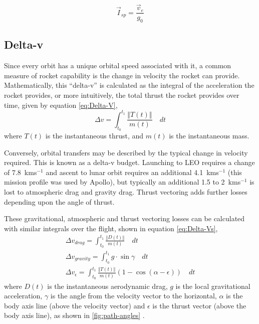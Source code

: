 \begin{equation}
\vec{I}_{sp}=\frac{\vec{v}_e}{g_0}
\end{equation}

\subsection{Delta-v} \label{sub:Delta-v}

Since every orbit has a unique orbital speed associated with it, a common measure of rocket capability is the change in velocity the rocket can provide. Mathematically, this \enquote{delta-v} is calculated as the integral of the acceleration the rocket provides, or more intuitively, the total thrust the rocket provides over time, given by equation \eqref{eq:Delta-V},
\begin{equation}\label{eq:Delta-V}
\Delta v=\int_{t_{0}}^{t_{1}}\frac{\left\Vert T\left(t\right)\right\Vert }{m\left(t\right)}\quad dt
\end{equation}
where $T\left(t\right)$ is the instantaneous thrust, and $m\left(t\right)$ is the instantaneous mass.

Conversely, orbital transfers may be described by the typical change in velocity required. This is known as a delta-v budget. Launching to LEO requires a change of 7.8~kms$^{-1}$ and ascent to lunar orbit requires an additional 4.1~kms$^{-1}$ (this mission profile was used by Apollo), but typically an additional 1.5 to 2~kms$^{-1}$ is lost to atmospheric drag and gravity drag. Thrust vectoring adds further losses depending upon the angle of thrust. 

These gravitational, atmospheric and thrust vectoring losses can be calculated with similar integrals over the flight, shown in equation \eqref{eq:Delta-Vs},
\begin{subequations} \label{eq:Delta-Vs}
\begin{gather}
\Delta v_{drag}=\int_{t_0}^{t_1}\frac{\left\Vert D\left(t\right)\right\Vert }{m\left(t\right)}\quad dt\label{eq:drag-penalty} \\
\Delta v_{gravity}=\int_{t_0}^{t_1}g\cdot\sin\gamma\quad dt\label{eq:gravity-penalty} \\
\Delta v_\epsilon=\int_{t_0}^{t_1}\frac{\left\Vert T\left(t\right)\right\Vert }{m\left(t\right)}(1-\cos(\alpha-\epsilon))\quad dt\label{eq:thrust-vectoring-penalty}
\end{gather}
\end{subequations}
where $D(t)$ is the instantaneous aerodynamic drag, $g$ is the local gravitational acceleration, $\gamma$ is the angle from the velocity vector to the horizontal, $\alpha$ is the body axis line (above the velocity vector) and $\epsilon$ is the thrust vector (above the body axis line), as shown in \autoref{fig:path-angles} \parencite{Tetlow2003}. 

